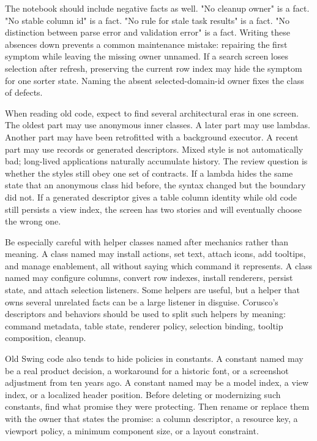 The notebook should include negative facts as well. "No cleanup owner" is a
fact. "No stable column id" is a fact. "No rule for stale task results" is a
fact. "No distinction between parse error and validation error" is a fact.
Writing these absences down prevents a common maintenance mistake: repairing the
first symptom while leaving the missing owner unnamed. If a search screen loses
selection after refresh, preserving the current row index may hide the symptom
for one sorter state. Naming the absent selected-domain-id owner fixes the
class of defects.

When reading old code, expect to find several architectural eras in one screen.
The oldest part may use anonymous inner classes. A later part may use lambdas.
Another part may have been retrofitted with a background executor. A recent part
may use records or generated descriptors. Mixed style is not automatically bad;
long-lived applications naturally accumulate history. The review question is
whether the styles still obey one set of contracts. If a lambda hides the same
state that an anonymous class hid before, the syntax changed but the boundary
did not. If a generated descriptor gives a table column identity while old code
still persists a view index, the screen has two stories and will eventually
choose the wrong one.

Be especially careful with helper classes named after mechanics rather than
meaning. A class named  may install actions, set text, attach
icons, add tooltips, and manage enablement, all without saying which command it
represents. A class named  may configure columns, convert row
indexes, install renderers, persist state, and attach selection listeners. Some
helpers are useful, but a helper that owns several unrelated facts can be a
large listener in disguise. Corusco's descriptors and behaviors should be used
to split such helpers by meaning: command metadata, table state, renderer
policy, selection binding, tooltip composition, cleanup.

Old Swing code also tends to hide policies in constants. A constant named
 may be a real product decision, a workaround for a
historic font, or a screenshot adjustment from ten years ago. A constant named
 may be a model index, a view index, or a localized header
position. Before deleting or modernizing such constants, find what promise they
were protecting. Then rename or replace them with the owner that states the
promise: a column descriptor, a resource key, a viewport policy, a minimum
component size, or a layout constraint.

